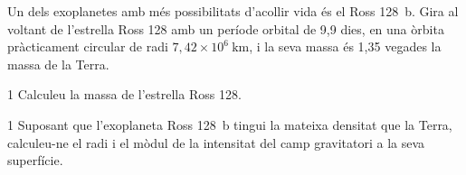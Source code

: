 Un dels exoplanetes amb més possibilitats d'acollir vida és el Ross 128~b. Gira al voltant de l'estrella Ross 128 amb un període orbital de 9,9 dies, en una òrbita pràcticament circular de radi $7,42\times 10^{6}\ \mathrm{km}$, i la seva massa és 1,35 vegades la massa de la Terra.


\begin{apartat}{1}
Calculeu la massa de l'estrella Ross 128.
\end{apartat}

\begin{apartat}{1}
Suposant que l'exoplaneta Ross 128~b tingui la mateixa densitat que la Terra, calculeu-ne el radi i el mòdul de la intensitat del camp gravitatori a la seva superfície.
\end{apartat}

